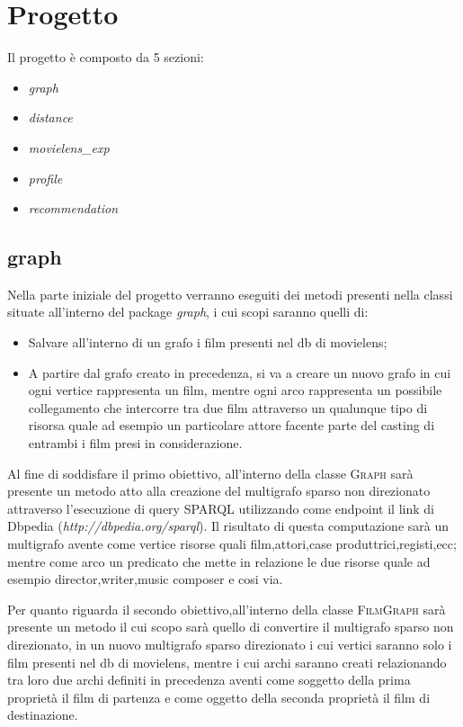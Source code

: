 \section{Progetto}
\label{project}
Il progetto è composto da 5 sezioni:
\begin{itemize}
\item\emph{graph}
\item\emph{distance}
\item\emph{movielens\_exp}
\item\emph{profile}
\item\emph{recommendation}
\end{itemize}
\subsection{graph}
Nella parte iniziale del progetto verranno eseguiti dei metodi presenti nella classi situate all'interno del package \emph{graph}, i cui scopi saranno quelli di:
\begin{itemize}
\item Salvare all'interno di un grafo i film presenti nel db di movielens;
\item A partire dal grafo creato in precedenza, si va a creare un nuovo grafo in cui ogni vertice rappresenta un film, mentre ogni arco rappresenta un possibile collegamento che intercorre tra due film attraverso un qualunque tipo di risorsa quale ad esempio un particolare attore facente parte del casting di entrambi i film presi in considerazione.
\end{itemize}
Al fine di soddisfare il primo obiettivo, all'interno della classe \textsc{Graph} sarà presente un metodo atto alla creazione del multigrafo sparso non direzionato attraverso l'esecuzione di query SPARQL utilizzando come endpoint il link di Dbpedia (\textit{http://dbpedia.org/sparql}).
Il risultato di questa computazione sarà un multigrafo avente come vertice risorse quali film,attori,case produttrici,registi,ecc; mentre come arco un predicato che mette in relazione le due risorse quale ad esempio director,writer,music composer e cosi via.

Per quanto riguarda il secondo obiettivo,all'interno della classe \textsc{FilmGraph} sarà presente un metodo il cui scopo sarà quello di convertire il multigrafo sparso non direzionato, in un nuovo multigrafo sparso direzionato i cui vertici saranno solo i film presenti nel db di movielens, mentre i cui archi saranno creati relazionando tra loro due archi definiti in precedenza aventi come soggetto della prima proprietà il film di partenza e come oggetto della seconda proprietà il film di destinazione.
